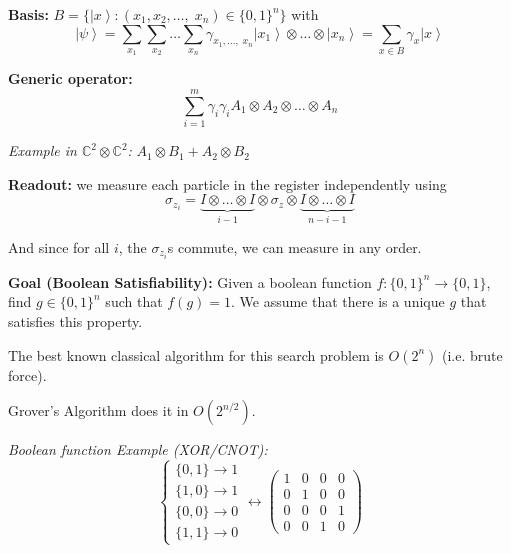 \documentclass[12pt]{article}
\newcommand{\C}{\mathbb{C}}
\newcommand{\ket}[1]{\left\vert #1 \right\rangle}
\begin{document}
        \textbf{Basis:} $B = \{\ket{x}: (x_1, x_2, \dots,\; x_n) \in \{0, 1\}^{n}\}$ with 
        \[\ket{\psi} = \sum_{x_1} \sum_{x_2}\dots \sum_{x_n} \gamma_{x_1, \dots,\; x_n} \ket{x_1} \otimes \dots\otimes \ket{x_n} = \sum_{x\in B} \gamma_x \ket{x}\]

       \textbf{Generic operator:}
        \[\sum_{i=1}^m\gamma_{i} \gamma_i A_1 \otimes A_2 \otimes \dots \otimes A_n\]

        \emph{Example in $\C^2 \otimes \C^2$:} $A_1 \otimes B_1 + A_2 \otimes B_2$

        \textbf{Readout:} we measure each particle in the register independently using
        \[\sigma_{z_i} = \underbrace{I \otimes \dots \otimes I}_{i-1}\otimes \sigma_z \otimes \underbrace{I \otimes \dots \otimes I}_{n-i-1}\]

        And since for all $i$, the $\sigma_{z_i}$s commute, we can measure in any order. 

        \textbf{Goal (Boolean Satisfiability):} Given a boolean function $f: \{0, 1\}^n \to \{0, 1\}$, find $g \in \{0, 1\}^n$ such that $f(g) = 1$. We assume that there is a unique $g$ that satisfies this property. 

        The best known classical algorithm for this search problem is $O(2^n)$ (i.e. brute force).
        
        Grover's Algorithm does it in $O(2^{n/2})$.
        
        \emph{Boolean function Example (XOR/CNOT):} 
        \[\begin{cases}
            \{0, 1\} \to 1\\ 
            \{1, 0\} \to 1\\
            \{0, 0\} \to 0\\
            \{1, 1\} \to 0
        \end{cases} \longleftrightarrow \begin{pmatrix}
            1 & 0 & 0 & 0\\
            0 & 1 & 0 & 0\\
            0 & 0 & 0 & 1\\
            0 & 0 & 1 & 0
        \end{pmatrix}\]
\end{document}
